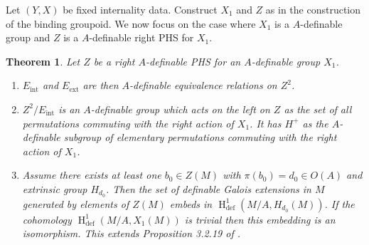 \documentclass{amsart}
\newtheorem{theorem}{Theorem}[section]
\theoremstyle{definition}
\theoremstyle{remark}
\numberwithin{equation}{section}
\def \defin {\operatorname{def}}
\def \HH {\operatorname{H}}
\begin{document}
Let $(Y,X)$ be fixed internality data. Construct $X_1$ and $Z$ as in the construction of the binding groupoid. We now focus on the case where $X_1$ is a $A$-definable group and $Z$ is a $A$-definable right PHS for $X_1$.


\begin{theorem}
    Let $Z$ be a right $A$-definable PHS for an $A$-definable group $X_1$. 
    \begin{enumerate}
        \item $E_{\text{int}}$ and $E_{\text{ext}}$ are then $A$-definable equivalence relations on $Z^2$. 
        \item $Z^2/E_{\text{int}}$ is an $A$-definable group which acts on the left on $Z$ as the set of all permutations commuting with the right action of $X_1$. It has $H^+$ as the $A$-definable subgroup of elementary permutations commuting with the right action of $X_1$.
        
        \item Assume there exists at least one $b_0 \in Z(M)$ with $\pi(b_0) = d_0 \in O(A)$ and extrinsic group $H_{d_0}$. Then the set of definable Galois  extensions in $M$ generated by elements of $Z(M)$ embeds in $\HH^{1}_{\defin}(M/A,H_{d_0}(M))$. If the cohomology $\HH^{1}_{\defin}(M/A,X_1(M))$ is trivial then this embedding is an isomorphism. This extends Proposition 3.2.19 of \cite{MeretzkyThesis}.
    \end{enumerate}
\end{theorem}
\end{document}
